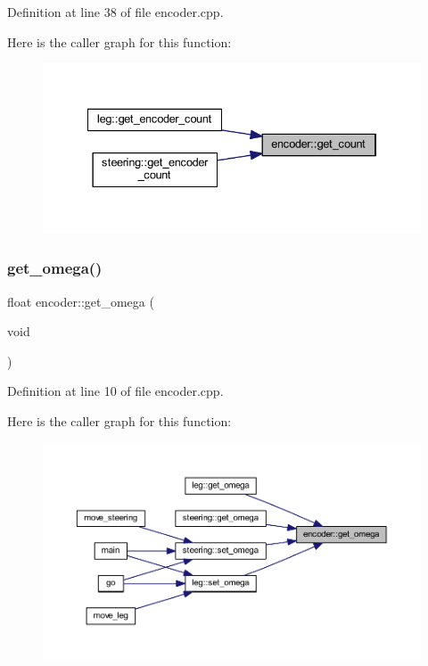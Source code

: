 Definition at line 38 of file encoder.\+cpp.

Here is the caller graph for this function\+:
\nopagebreak
\begin{figure}[H]
\begin{center}
\leavevmode
\includegraphics[width=334pt]{classencoder_a78c1ba3f2bd3abb6714a38b21a2f48e1_icgraph}
\end{center}
\end{figure}
\mbox{\label{classencoder_a9be6cc4f517fdc88970eb5d39e52f5c8}} 
\subsubsection{\texorpdfstring{get\_omega()}{get\_omega()}}
{\footnotesize\ttfamily float encoder\+::get\+\_\+omega (\begin{DoxyParamCaption}\item[{void}]{ }\end{DoxyParamCaption})}



Definition at line 10 of file encoder.\+cpp.

Here is the caller graph for this function\+:
\nopagebreak
\begin{figure}[H]
\begin{center}
\leavevmode
\includegraphics[width=350pt]{classencoder_a9be6cc4f517fdc88970eb5d39e52f5c8_icgraph}
\end{center}
\end{figure}
\mbox{\label{classencoder_a2e2784d15f3f7e13aecde2ead7a43a68}} 
